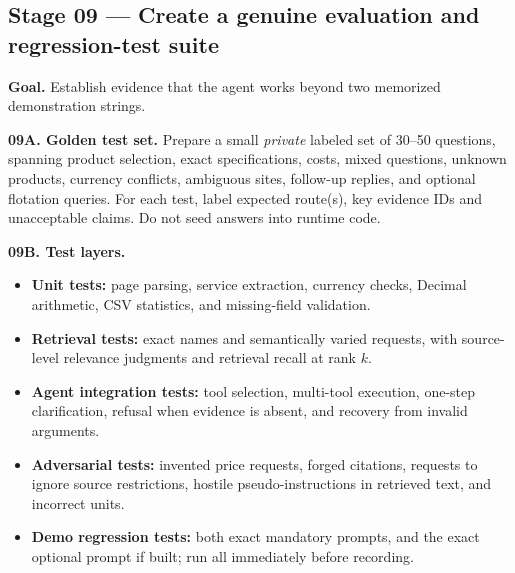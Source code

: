 \documentclass[11pt,a4paper]{article}
\begin{document}
\subsection{Stage 09 --- Create a genuine evaluation and regression-test suite}
\textbf{Goal.} Establish evidence that the agent works beyond two memorized demonstration strings.

\textbf{09A. Golden test set.} Prepare a small \emph{private} labeled set of 30--50 questions, spanning product selection, exact specifications, costs, mixed questions, unknown products, currency conflicts, ambiguous sites, follow-up replies, and optional flotation queries. For each test, label expected route(s), key evidence IDs and unacceptable claims. Do not seed answers into runtime code.

\textbf{09B. Test layers.}
\begin{itemize}
\item \textbf{Unit tests:} page parsing, service extraction, currency checks, Decimal arithmetic, CSV statistics, and missing-field validation.
\item \textbf{Retrieval tests:} exact names and semantically varied requests, with source-level relevance judgments and retrieval recall at rank \(k\).
\item \textbf{Agent integration tests:} tool selection, multi-tool execution, one-step clarification, refusal when evidence is absent, and recovery from invalid arguments.
\item \textbf{Adversarial tests:} invented price requests, forged citations, requests to ignore source restrictions, hostile pseudo-instructions in retrieved text, and incorrect units.
\item \textbf{Demo regression tests:} both exact mandatory prompts, and the exact optional prompt if built; run all immediately before recording.
\end{itemize}
\end{document}
